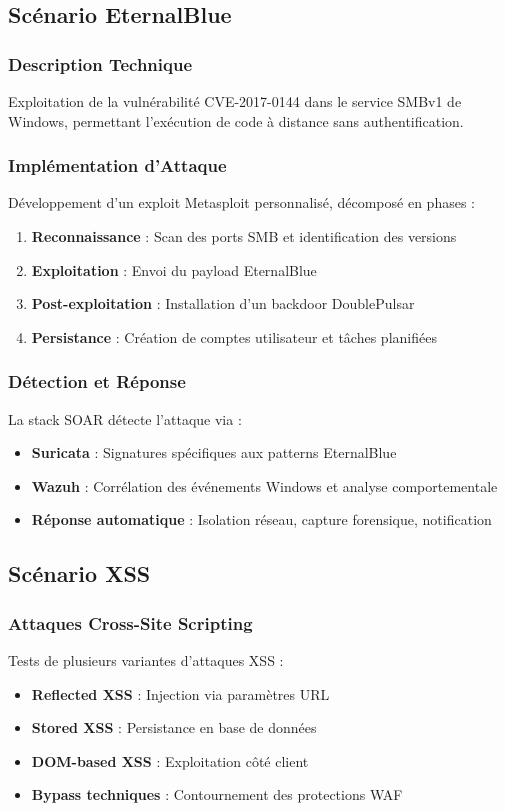 \subsection{Scénario EternalBlue}

\subsubsection{Description Technique}
Exploitation de la vulnérabilité CVE-2017-0144 dans le service SMBv1 de Windows, permettant l'exécution de code à distance sans authentification.

\subsubsection{Implémentation d'Attaque}
Développement d'un exploit Metasploit personnalisé, décomposé en phases :
\begin{enumerate}
    \item \textbf{Reconnaissance} : Scan des ports SMB et identification des versions
    \item \textbf{Exploitation} : Envoi du payload EternalBlue
    \item \textbf{Post-exploitation} : Installation d'un backdoor DoublePulsar
    \item \textbf{Persistance} : Création de comptes utilisateur et tâches planifiées
\end{enumerate}

\subsubsection{Détection et Réponse}
La stack SOAR détecte l'attaque via :
\begin{itemize}
    \item \textbf{Suricata} : Signatures spécifiques aux patterns EternalBlue
    \item \textbf{Wazuh} : Corrélation des événements Windows et analyse comportementale
    \item \textbf{Réponse automatique} : Isolation réseau, capture forensique, notification
\end{itemize}

\subsection{Scénario XSS}

\subsubsection{Attaques Cross-Site Scripting}
Tests de plusieurs variantes d'attaques XSS :
\begin{itemize}
    \item \textbf{Reflected XSS} : Injection via paramètres URL
    \item \textbf{Stored XSS} : Persistance en base de données
    \item \textbf{DOM-based XSS} : Exploitation côté client
    \item \textbf{Bypass techniques} : Contournement des protections WAF
\end{itemize}

